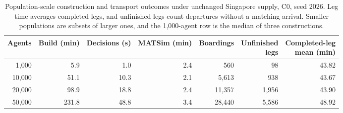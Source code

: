 \begin{table}[pos=htbp]
\centering\small
\setlength{\tabcolsep}{3pt}
\caption{Population-scale construction and transport outcomes under unchanged Singapore supply, C0, seed 2026. Leg time averages completed legs, and unfinished legs count departures without a matching arrival. Smaller populations are subsets of larger ones, and the 1,000-agent row is the median of three constructions.}
\label{tab:scale_full}
\begin{tabular}{@{}rrrrrrr@{}}
\toprule
Agents & Build (min) & Decisions (s) & MATSim (min) & Boardings & \shortstack{Unfinished\\legs} & \shortstack{Completed-leg\\mean (min)} \\
\midrule
1,000 & 5.9 & 1.0 & 2.4 & 560 & 98 & 43.82 \\
10,000 & 51.1 & 10.3 & 2.1 & 5,613 & 938 & 43.67 \\
20,000 & 98.9 & 18.8 & 2.4 & 11,357 & 1,956 & 43.90 \\
50,000 & 231.8 & 48.8 & 3.4 & 28,440 & 5,586 & 48.92 \\
\bottomrule
\end{tabular}
\end{table}
